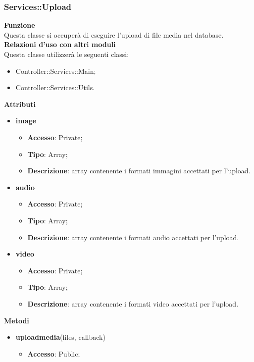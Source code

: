 {{		\subsubsection{Services::\-Upload}{
			\label{sub:servicesUpload}
			\textbf{Funzione}\\
			\indent Questa classe si occuperà di eseguire l'upload di file media nel database.\\
			\textbf{Relazioni d'uso con altri moduli}\\
			\indent Questa classe utilizzerà le seguenti classi:
			\begin{itemize}
				\item Controller::Services::\-Main;
				\item Controller::Services::\-Utils.
			\end{itemize}
			\textbf{Attributi}
			\begin{itemize}
				\item \textbf{image}
				\begin{itemize}
					\item \textbf{Accesso}: Private;
					\item \textbf{Tipo}: Array;
					\item \textbf{Descrizione}: array contenente i formati immagini accettati per l'upload.
				\end{itemize}
				\item \textbf{audio}
				\begin{itemize}
					\item \textbf{Accesso}: Private;
					\item \textbf{Tipo}: Array;
					\item \textbf{Descrizione}: array contenente i formati audio accettati per l'upload.
				\end{itemize}
				\item \textbf{video}
				\begin{itemize}
					\item \textbf{Accesso}: Private;
					\item \textbf{Tipo}: Array;
					\item \textbf{Descrizione}: array contenente i formati video accettati per l'upload.
				\end{itemize}
			\end{itemize}
			\textbf{Metodi}
			\begin{itemize}
				\item \textbf{uploadmedia}(files, callback)
				\begin{itemize}
					\item \textbf{Accesso}: Public;

\end{itemize}
\end{itemize}}}}
